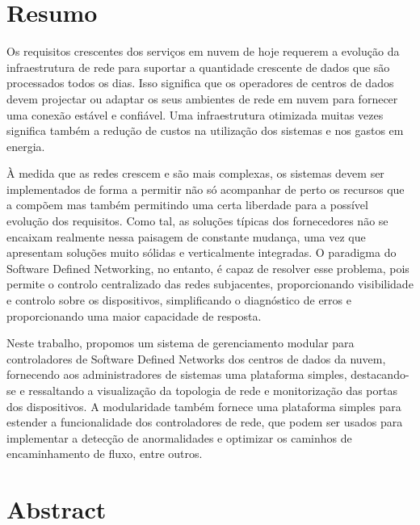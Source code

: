 \chapter*{Resumo}
Os requisitos crescentes dos serviços em nuvem de hoje requerem a evolução da infraestrutura de rede para suportar a quantidade crescente de dados que são
processados todos os dias. Isso significa que os operadores de centros de dados devem projectar ou adaptar os seus ambientes de rede em nuvem para fornecer
uma conexão estável e confiável.  Uma infraestrutura otimizada muitas vezes significa também a redução de custos na utilização dos sistemas e nos gastos em energia.

\par À medida que as redes crescem e são mais complexas, os sistemas devem ser implementados de forma a permitir não só acompanhar de perto os recursos que a compõem 
 mas também permitindo uma certa liberdade para a possível evolução dos requisitos. Como tal, as soluções típicas dos fornecedores não se encaixam
realmente nessa paisagem de constante mudança, uma vez que apresentam soluções muito sólidas e verticalmente integradas. O paradigma do Software Defined Networking, 
no entanto, é capaz de resolver esse problema, pois permite o controlo centralizado das redes subjacentes, proporcionando visibilidade e controlo sobre os 
dispositivos, simplificando o diagnóstico de erros e proporcionando uma maior capacidade de resposta.

\par Neste trabalho, propomos um sistema de gerenciamento modular para controladores de Software Defined Networks dos centros de dados da nuvem, fornecendo aos
administradores de sistemas uma plataforma simples, destacando-se e ressaltando a visualização da topologia de rede e monitorização das portas dos dispositivos. A
modularidade também fornece uma plataforma simples para estender a funcionalidade dos controladores de rede, que podem ser usados para implementar a detecção de 
anormalidades e optimizar os caminhos de encaminhamento de fluxo, entre outros.

\chapter*{Abstract}

